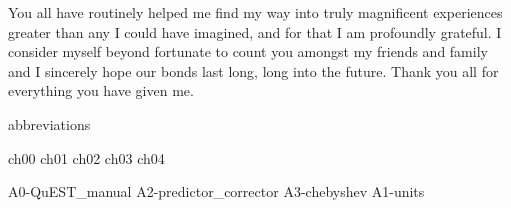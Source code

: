 \documentclass[mixedtoc]{msu-thesis-custom}
\begin{document}
You all have routinely helped me find my way into truly magnificent experiences
greater than any I could have imagined, and for that I am profoundly grateful. I
consider myself beyond fortunate to count you amongst my friends and family and
I sincerely hope our bonds last long, long into the future. Thank you all for
everything you have given me.

\begin{center}
  \smiley{}
\end{center}



\clearpage
\SingleSpacing
\tableofcontents* %
\clearpage
\listoftables %
\clearpage
\listoffigures %

%
\makenomenclature
{abbreviations}

\mainmatter
%

{ch00}
{ch01}
{ch02}
{ch03}
{ch04}

%
%

\begin{appendices}
  {A0-QuEST_manual}
  {A2-predictor_corrector}
  {A3-chebyshev}
  {A1-units}
\end{appendices}

\backmatter
%
%
\makebibliographypage %
%
\SingleSpacing
\end{document}
